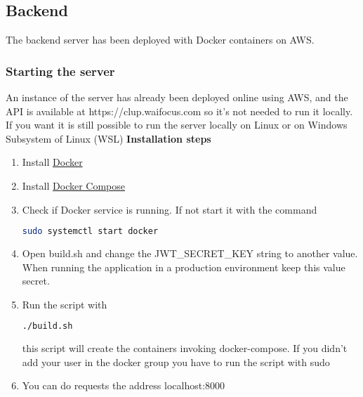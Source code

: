 \subsection{Backend}
The backend server has been deployed with Docker containers on AWS.



\subsubsection{Starting the server}
An instance of the server has already been deployed online using AWS, and the API is available at https://clup.waifocus.com so it's not needed to run it locally.
If you want it is still possible to run the server locally on Linux or on Windows Subsystem of Linux (WSL)
\textbf{Installation steps}
\begin{enumerate}
    \item Install \href{https://docs.docker.com/get-docker/}{Docker}
    \item Install \href{https://docs.docker.com/compose/install/}{Docker Compose}
    \item Check if Docker service is running. If not start it with the command
    \begin{lstlisting}[language=bash]
    sudo systemctl start docker
    \end{lstlisting}
    \item  Open build.sh and change the JWT\_SECRET\_KEY string to another value. When running the application in a production environment keep this value secret.
    \item Run the script with 
    \begin{lstlisting}[language=bash]
    ./build.sh
    \end{lstlisting}
    this script will create the containers invoking docker-compose. If you didn't add your user in the docker group 
    you have to run the script with sudo
    \item You can do requests the address localhost:8000 
\end{enumerate}

